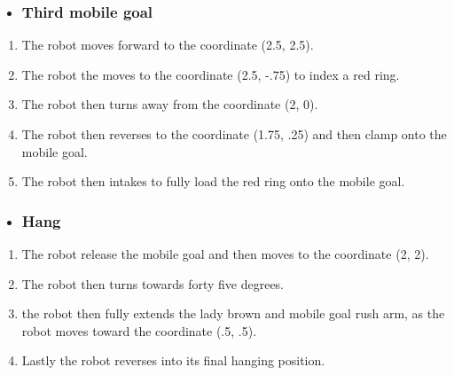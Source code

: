 \begin{itemize}
    \item \subsubsection{Third mobile goal}
\end{itemize}
\begin{enumerate}
    \item The robot moves forward to the coordinate (2.5, 2.5).
    \item The robot the moves to the coordinate (2.5, -.75) to index a red ring.
    \item The robot then turns away from the coordinate (2, 0).
    \item The robot then reverses to the coordinate (1.75, .25) and then clamp onto the mobile goal.
    \item The robot then intakes to fully load the red ring onto the mobile goal.
\end{enumerate}
\begin{itemize}
    \item \subsubsection{Hang}
\end{itemize}
\begin{enumerate}
    \item The robot release the mobile goal and then moves to the coordinate (2, 2).
    \item The robot then turns towards forty five degrees.
    \item the robot then fully extends the lady brown and mobile goal rush arm, as the robot moves toward the coordinate (.5, .5).
    \item Lastly the robot reverses into its final hanging position.
\end{enumerate}

